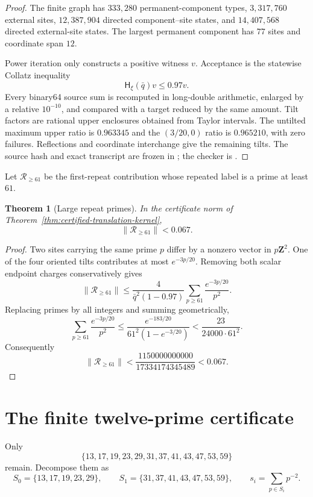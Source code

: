 \documentclass[11pt]{article}
\newtheorem{theorem}{Theorem}[section]
\theoremstyle{definition}
\theoremstyle{remark}
\newcommand{\Z}{\mathbf Z}
\begin{document}
\begin{proof}
The finite graph has $333{,}280$ permanent-component types,
$3{,}317{,}760$ external sites, $12{,}387{,}904$ directed
component--site states, and $14{,}407{,}568$ directed external-site states.
The largest permanent component has $77$ sites and coordinate span $12$.

Power iteration only constructs a positive witness $v$.  Acceptance is the
statewise Collatz inequality
\[
 \mathsf H_\xi(\bar q)v\leq0.97v.
\]
Every binary64 source sum is recomputed in long-double arithmetic, enlarged
by a relative $10^{-10}$, and compared with a target reduced by the same
amount.  Tilt factors are rational upper enclosures obtained from Taylor
intervals.  The untilted maximum upper ratio is $0.963345$ and the
$(3/20,0)$ ratio is $0.965210$, with zero failures.  Reflections and coordinate
interchange give the remaining tilts.  The source hash and exact transcript
are frozen in ; the checker is
.
\end{proof}

Let $\mathcal R_{\geq61}$ be the first-repeat contribution whose repeated
label is a prime at least $61$.

\begin{theorem}[Large repeat primes]
\label{thm:large-repeat-tail}
In the certificate norm of
Theorem~\ref{thm:certified-translation-kernel},
\[
 \|\mathcal R_{\geq61}\|<0.067.
\]
\end{theorem}

\begin{proof}
Two sites carrying the same prime $p$ differ by a nonzero vector in
$p\Z^2$.  One of the four oriented tilts contributes at most $e^{-3p/20}$.
Removing both scalar endpoint charges conservatively gives
\[
 \|\mathcal R_{\geq61}\|
 \leq\frac4{\bar q^2(1-0.97)}
       \sum_{p\geq61}\frac{e^{-3p/20}}{p^2}.
\]
Replacing primes by all integers and summing geometrically,
\[
 \sum_{p\geq61}\frac{e^{-3p/20}}{p^2}
 \leq\frac{e^{-183/20}}{61^2(1-e^{-3/20})}
 <\frac{23}{24000\cdot61^2}.
\]
Consequently
\[
 \|\mathcal R_{\geq61}\|
 <\frac{1150000000000}{17334174345489}<0.067.
\]
\end{proof}

\section{The finite twelve-prime certificate}

Only
\[
 \{13,17,19,23,29,31,37,41,43,47,53,59\}
\]
remain.  Decompose them as
\[
 S_0=\{13,17,19,23,29\},\qquad
 S_1=\{31,37,41,43,47,53,59\},\qquad
 s_i=\sum_{p\in S_i}p^{-2}.
\]
\end{document}
